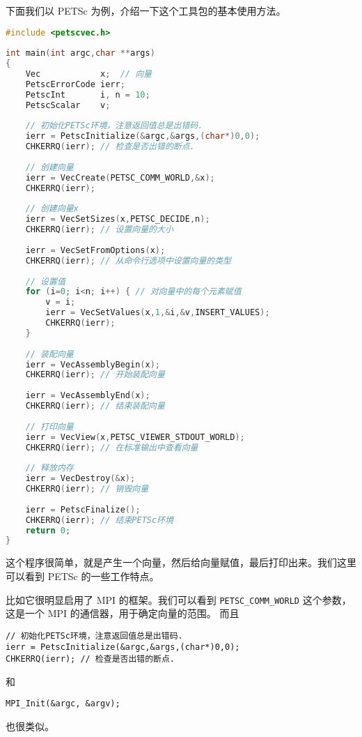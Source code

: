 \documentclass{ctexart}
\begin{document}
下面我们以 PETSc 为例，介绍一下这个工具包的基本使用方法。

\begin{lstlisting}[language=C]
#include <petscvec.h>  
  
int main(int argc,char **args)  
{  
    Vec            x;  // 向量  
    PetscErrorCode ierr;  
    PetscInt       i, n = 10;  
    PetscScalar    v;  
    
    // 初始化PETSc环境，注意返回值总是出错码.  
    ierr = PetscInitialize(&argc,&args,(char*)0,0);
    CHKERRQ(ierr); // 检查是否出错的断点.
      
    // 创建向量  
    ierr = VecCreate(PETSC_COMM_WORLD,&x);
    CHKERRQ(ierr); 
    
    // 创建向量x  
    ierr = VecSetSizes(x,PETSC_DECIDE,n);
    CHKERRQ(ierr); // 设置向量的大小  
    
    ierr = VecSetFromOptions(x);
    CHKERRQ(ierr); // 从命令行选项中设置向量的类型  
      
    // 设置值  
    for (i=0; i<n; i++) { // 对向量中的每个元素赋值  
        v = i;  
        ierr = VecSetValues(x,1,&i,&v,INSERT_VALUES);
        CHKERRQ(ierr);  
    }  
      
    // 装配向量  
    ierr = VecAssemblyBegin(x);
    CHKERRQ(ierr); // 开始装配向量  
        
    ierr = VecAssemblyEnd(x);
    CHKERRQ(ierr); // 结束装配向量  
      
    // 打印向量  
    ierr = VecView(x,PETSC_VIEWER_STDOUT_WORLD);
    CHKERRQ(ierr); // 在标准输出中查看向量  
      
    // 释放内存  
    ierr = VecDestroy(&x);
    CHKERRQ(ierr); // 销毁向量  
      
    ierr = PetscFinalize();
    CHKERRQ(ierr); // 结束PETSc环境  
    return 0;  
}          
\end{lstlisting}

这个程序很简单，就是产生一个向量，然后给向量赋值，最后打印出来。我们这里可以看到 PETSc 的一些工作特点。

比如它很明显启用了 MPI 的框架。我们可以看到 \texttt{PETSC\_COMM\_WORLD} 这个参数，这是一个 MPI 的通信器，用于确定向量的范围。
而且
\begin{verbatim}
// 初始化PETSc环境，注意返回值总是出错码.  
ierr = PetscInitialize(&argc,&args,(char*)0,0);
CHKERRQ(ierr); // 检查是否出错的断点.    
\end{verbatim}
和
\begin{verbatim}
MPI_Init(&argc, &argv);      
\end{verbatim}
也很类似。
\end{document}
